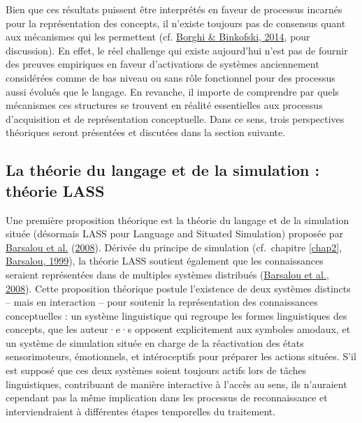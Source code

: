 \documentclass[
  a4paper,12pt,twoside,onecolumn,openright,final,oldfontcommands]{memoir}
\begin{document}
Bien que ces résultats puissent être interprétés en faveur de processus incarnés pour la représentation des concepts, il n'existe toujours pas de consensus quant aux mécanismes qui les permettent (cf. \protect\hyperlink{ref-borghi_words_2014}{Borghi \& Binkofski, 2014}, pour discussion). En effet, le réel challenge qui existe aujourd'hui n'est pas de fournir des preuves empiriques en faveur d'activations de systèmes anciennement considérées comme de bas niveau ou sans rôle fonctionnel pour des processus aussi évolués que le langage. En revanche, il importe de comprendre par quels mécanismes ces structures se trouvent en réalité essentielles aux processus d'acquisition et de représentation conceptuelle. Dans ce sens, trois perspectives théoriques seront présentées et discutées dans la section suivante.

\hypertarget{lass}{%
\subsection{La théorie du langage et de la simulation : théorie LASS}\label{lass}}

Une première proposition théorique est la théorie du langage et de la simulation située (désormais LASS pour Language and Situated Simulation) proposée par \protect\hyperlink{ref-barsalou_language_2008}{Barsalou et al.} (\protect\hyperlink{ref-barsalou_language_2008}{2008}). Dérivée du principe de simulation (cf.~chapitre \ref{chap2}, \protect\hyperlink{ref-barsalou_perceptual_1999}{Barsalou, 1999}), la théorie LASS soutient également que les connaissances seraient représentées dans de multiples systèmes distribués (\protect\hyperlink{ref-barsalou_language_2008}{Barsalou et al., 2008}). Cette proposition théorique postule l'existence de deux systèmes distincts -- mais en interaction -- pour soutenir la représentation des connaissances conceptuelles : un système linguistique qui regroupe les formes linguistiques des concepts, que les auteur·e·s opposent explicitement aux symboles amodaux, et un système de simulation située en charge de la réactivation des états sensorimoteurs, émotionnels, et intéroceptifs pour préparer les actions situées. S'il est supposé que ces deux systèmes soient toujours actifs lors de tâches linguistiques, contribuant de manière interactive à l'accès au sens, ils n'auraient cependant pas la même implication dans les processus de reconnaissance et interviendraient à différentes étapes temporelles du traitement.
\end{document}
